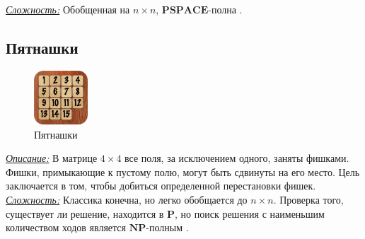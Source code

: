 \documentclass{article}
\begin{document}
\noindent\textit{\underline{Сложность:}} Обобщенная на $n \times n$, $\mathbf{PSPACE}$-полна \cite{othello}.

\vspace*{0.3in}





\subsection*{Пятнашки}

\begin{figure}
    \centering
    \includegraphics[width=0.18\textwidth]{15puzzle.png}
    \caption{Пятнашки}
\end{figure}


\noindent\textit{\underline{Описание:}} В матрице $4 \times 4$ все поля, за исключением одного, заняты фишками. Фишки, примыкающие к пустому полю, могут быть сдвинуты на его место. Цель заключается в том, чтобы добиться определенной перестановки фишек. \\

\noindent\textit{\underline{Сложность:}} Классика конечна, но легко обобщается до $n \times n$. Проверка того, существует ли решение, находится в $\mathbf{P}$, но поиск решения с наименьшим количеством ходов является $\mathbf{NP}$-полным \cite{fifteen}.
\end{document}
